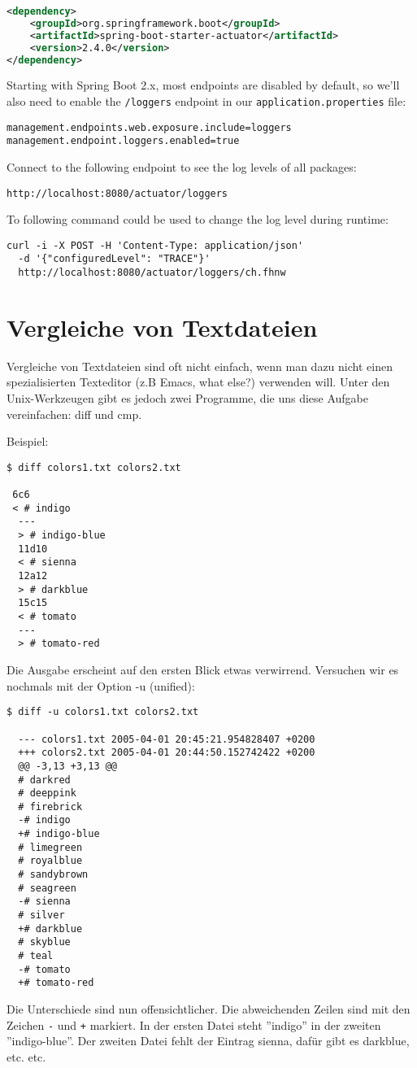 \begin{lstlisting}[language=xml]
<dependency>
    <groupId>org.springframework.boot</groupId>
    <artifactId>spring-boot-starter-actuator</artifactId>
    <version>2.4.0</version>
</dependency>
\end{lstlisting}

Starting with Spring Boot 2.x, most endpoints are disabled by
default, so we'll also need to enable the \verb|/loggers| endpoint in
our \verb|application.properties| file:

\begin{lstlisting}
management.endpoints.web.exposure.include=loggers
management.endpoint.loggers.enabled=true
\end{lstlisting}

Connect to the following endpoint to see the log levels of all
packages:

\begin{lstlisting}
http://localhost:8080/actuator/loggers
\end{lstlisting}

To following command could be used to change the log level
during runtime:

\begin{lstlisting}
curl -i -X POST -H 'Content-Type: application/json'
  -d '{"configuredLevel": "TRACE"}'
  http://localhost:8080/actuator/loggers/ch.fhnw
\end{lstlisting}

%
\newslide
\section{Vergleiche von Textdateien}
Vergleiche von Textdateien sind oft nicht einfach, wenn man dazu
nicht einen spezialisierten Texteditor (z.B Emacs, what else?) verwenden will.
Unter den Unix-Werkzeugen gibt es jedoch zwei Programme, die
uns diese Aufgabe vereinfachen: diff und cmp.

\newslide
Beispiel:
\begin{lstlisting}[basicstyle=\small]
$ diff colors1.txt colors2.txt

 6c6
 < # indigo
  ---
  > # indigo-blue
  11d10
  < # sienna
  12a12
  > # darkblue
  15c15
  < # tomato
  ---
  > # tomato-red
\end{lstlisting}
\newslide
Die Ausgabe erscheint auf den ersten Blick etwas verwirrend.
Versuchen wir es nochmals mit der Option -u (unified):
\begin{lstlisting}
$ diff -u colors1.txt colors2.txt

  --- colors1.txt 2005-04-01 20:45:21.954828407 +0200
  +++ colors2.txt 2005-04-01 20:44:50.152742422 +0200
  @@ -3,13 +3,13 @@
  # darkred
  # deeppink
  # firebrick
  -# indigo
  +# indigo-blue
  # limegreen
  # royalblue
  # sandybrown
  # seagreen
  -# sienna
  # silver
  +# darkblue
  # skyblue
  # teal
  -# tomato
  +# tomato-red
\end{lstlisting}
Die Unterschiede sind nun offensichtlicher. Die abweichenden
Zeilen sind mit den Zeichen \verb+-+ und \verb|+| markiert.
In der ersten Datei steht ''indigo''
in der zweiten ''indigo-blue''. Der zweiten Datei fehlt der Eintrag
sienna, dafür gibt es darkblue, etc. etc.

